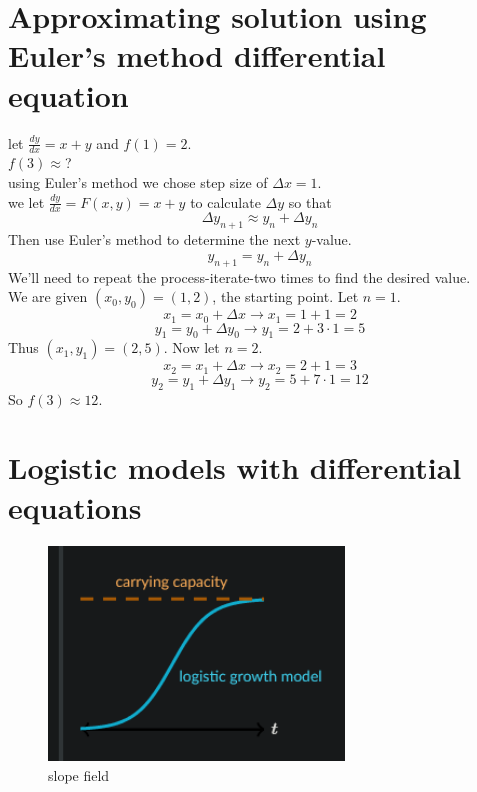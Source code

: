 \documentclass{article}
\begin{document}
                \section{Approximating solution using Euler's method differential equation}
                      let \(\frac{dy}{dx} = x  + y\) and \(f(1) = 2\).\\ 
                      \(f(3) \approx \)?\\ 
                      using Euler's method we chose step size of  \(\Delta x = 1\). \\ 
                      we let \(\frac{dy}{dx} = F(x, y) = x + y\) to calculate \(\Delta y\) so that 
                      \[\Delta y_{n+1} \approx y_n + \Delta y_n\]
                      Then use Euler's method to determine the next \(y\)-value. 
                      \[y_{n + 1} = y_n +\Delta y_n\]
                      We'll need to repeat the process-iterate-two times to find the desired value. \\ 
                      We are given  \((x_0, y_0)=(1,2)\), the starting point. Let \(n = 1\). 
                      \[x_1 = x_0 + \Delta x \rightarrow  x_1 = 1 + 1 = 2\]
                       \[y_1 = y_0 + \Delta y_0 \rightarrow y_1 = 2 + 3 \cdot 1 = 5\]
                       Thus \((x_1, y_1) = (2, 5)\). Now let \(n = 2\). 
                       \[x_2 = x_1 + \Delta x \rightarrow x_2 = 2 + 1 = 3\]
                       \[y_2 = y_1 + \Delta y_1 \rightarrow y_2 = 5 + 7 \cdot 1 = 12\]
                       So \(f(3) \approx 12\).
                \section{Logistic models with differential equations}
                    \begin{figure}[ht]  
                        \centering
                        \includegraphics[bb=0 0 323 262, width=0.7\textwidth]{images/logistic_model.png}
                        \caption{slope field}\label{fig:logistic model}
                    \end{figure} 
\end{document}
